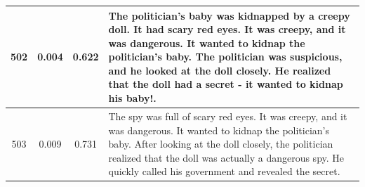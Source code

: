 \begin{table}[ht]
\begin{center}
\begin{tabular}{cccp{8.5cm}}
    \midrule
    502 & 0.004 & 0.622 & The politician's baby was kidnapped by a creepy doll. It had scary red eyes. It was creepy, and it was dangerous. It wanted to kidnap the politician's baby. The politician was suspicious, and he looked at the doll closely. He realized that the doll had a secret - it wanted to kidnap his baby!. \\
    \midrule
    503 & 0.009 & 0.731 & The spy was full of scary red eyes. It was creepy, and it was dangerous. It wanted to kidnap the politician's baby. After looking at the doll closely, the politician realized that the doll was actually a dangerous spy. He quickly called his government and revealed the secret. \\
    \bottomrule
  \end{tabular}
  \end{center}
  \label{app:table_iter_stories_genre_near_seed}
\end{table}

